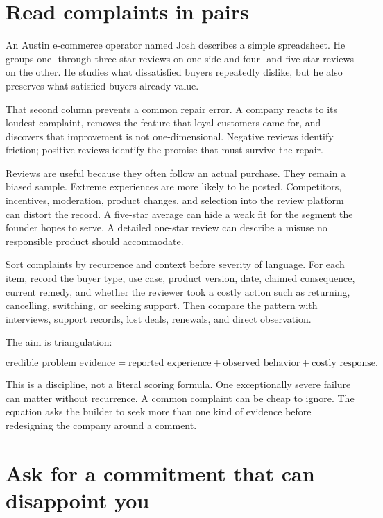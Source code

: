 \section{Read complaints in pairs}

An Austin e-commerce operator named Josh describes a simple spreadsheet. He
groups one- through three-star reviews on one side and four- and five-star
reviews on the other. He studies what dissatisfied buyers repeatedly dislike,
but he also preserves what satisfied buyers already value.

That second column prevents a common repair error. A company reacts to its
loudest complaint, removes the feature that loyal customers came for, and
discovers that improvement is not one-dimensional. Negative reviews identify
friction; positive reviews identify the promise that must survive the repair.

Reviews are useful because they often follow an actual purchase. They remain a
biased sample. Extreme experiences are more likely to be posted. Competitors,
incentives, moderation, product changes, and selection into the review platform
can distort the record. A five-star average can hide a weak fit for the segment
the founder hopes to serve. A detailed one-star review can describe a misuse no
responsible product should accommodate.

Sort complaints by recurrence and context before severity of language. For
each item, record the buyer type, use case, product version, date, claimed
consequence, current remedy, and whether the reviewer took a costly action such
as returning, cancelling, switching, or seeking support. Then compare the
pattern with interviews, support records, lost deals, renewals, and direct
observation.

The aim is triangulation:

\begin{equation}
\text{credible problem evidence}
  = \text{reported experience} + \text{observed behavior}
  + \text{costly response}.
\end{equation}

This is a discipline, not a literal scoring formula. One exceptionally severe
failure can matter without recurrence. A common complaint can be cheap to
ignore. The equation asks the builder to seek more than one kind of evidence
before redesigning the company around a comment.

\section{Ask for a commitment that can disappoint you}

